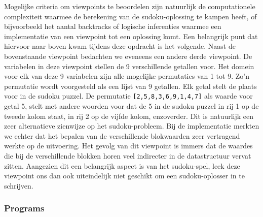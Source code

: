 Mogelijke criteria om viewpoints te beoordelen zijn natuurlijk de computationele complexiteit waarmee de berekening
van de sudoku-oplossing te kampen heeft, of bijvoorbeeld het aantal backtracks of logische inferenties waarmee 
een implementatie van een viewpoint tot een oplossing komt. Een belangrijk punt dat hiervoor naar boven kwam tijdens
deze opdracht is het volgende. Naast de bovenstaande viewpoint bedachten we eveneens een andere derde viewpoint.
De variabelen in deze viewpoint stellen de 9 verschillende getallen voor. Het domein voor elk van deze 9 variabelen
zijn alle mogelijke permutaties van 1 tot 9. Zo'n permutatie wordt voorgesteld als een lijst van 9 getallen. Elk getal stelt
de plaats voor in de sudoku puzzel. De permutatie \verb|[2,5,8,3,6,9,1,4,7]| als waarde voor getal 5, stelt met 
andere woorden voor dat de 5 in de sudoku puzzel in rij 1 op de tweede kolom staat, in rij 2 op de vijfde kolom, 
enzoverder. Dit is natuurlijk een zeer alternatieve zienwijze op het sudoku-probleem. Bij de implementatie merkten
we echter dat het bepalen van de verschillende blokwaarden zeer vertragend werkte op de uitvoering. Het gevolg
van dit viewpoint is immers dat de waardes die bij de verschillende blokken horen veel indirecter in 
de datastructuur vervat zitten. Aangezien dit een belangrijk aspect is van het sudoku-spel, leek
deze viewpoint ons dan ook uiteindelijk niet geschikt om een sudoku-oplosser in te schrijven. 

\subsubsection{Programs}
